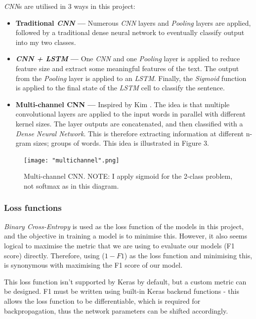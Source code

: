\documentclass[12pt,a4paper]{article}
\begin{document}
	\textit{CNN}s are utilised in 3 ways in this project:
	\begin{itemize}
		\item \textbf{Traditional \textit{CNN} --- }Numerous \textit{CNN} layers and \textit{Pooling} layers are applied, followed by a traditional dense neural network to eventually classify output into my two classes.
		\item \textbf{\textit{CNN + LSTM} --- }One \textit{CNN} and one \textit{Pooling} layer is applied to reduce feature size and extract some meaningful features of the text. The output from the \textit{Pooling} layer is applied to an \textit{LSTM}. Finally, the \textit{Sigmoid} function is applied to the final state of the \textit{LSTM} cell to classify the sentence.
		\item \textbf{Multi-channel CNN --- }Inspired by Kim \citeyear{Kim}. The idea is that multiple convolutional layers are applied to the input words in parallel with different kernel sizes. The layer outputs are concatenated, and then classified with a \textit{Dense Neural Network}. This is therefore extracting information at different n-gram sizes; groups of words. This idea is illustrated in Figure 3.
	\end{itemize}

	\begin{figure}[h]
		\centering
		\label{multichannel}
		\texttt{[image: "multichannel".png]}
		\caption{Multi-channel CNN. NOTE: I apply sigmoid for the 2-class problem, not softmax as in this diagram.}
	\end{figure}

	\subsubsection{Loss functions}
	\textit{Binary Cross-Entropy} is used as the loss function of the models in this project, and the objective in training a model is to minimise this. However, it also seems logical to maximise the metric that we are using to evaluate our models (F1 score) directly. Therefore, using ($1-F1$) as the loss function and minimising this, is synonymous with maximising the F1 score of our model. 
	
	This loss function isn't supported by Keras by default, but a custom metric can be designed. F1 must be written using built-in Keras backend functions - this allows the loss function to be differentiable, which is required for backpropagation, thus the network parameters can be shifted accordingly.
	
\end{document}
